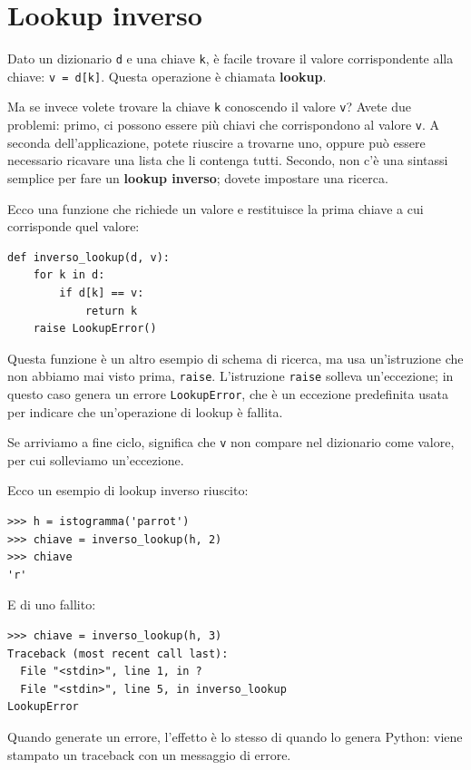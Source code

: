 \documentclass[10pt]{book}
\begin{document}
\section{Lookup inverso}
\label{raise}

Dato un dizionario {\tt d} e una chiave {\tt k}, è facile trovare il valore corrispondente alla chiave: {\tt v = d[k]}.  Questa operazione è chiamata {\bf lookup}.

Ma se invece volete trovare la chiave {\tt k} conoscendo il valore {\tt v}?
Avete due problemi: primo, ci possono essere più chiavi che corrispondono al valore {\tt v}.  A seconda dell'applicazione, potete riuscire a trovarne uno, oppure può essere necessario ricavare una lista che li contenga tutti. Secondo, non c'è una sintassi semplice per fare un {\bf lookup inverso}; dovete impostare una ricerca.

Ecco una funzione che richiede un valore e restituisce la prima chiave a cui corrisponde quel valore:

\begin{verbatim}
def inverso_lookup(d, v):
    for k in d:
        if d[k] == v:
            return k
    raise LookupError()
\end{verbatim}
%
Questa funzione è un altro esempio di schema di ricerca, ma usa un'istruzione che non abbiamo mai visto prima, {\tt raise}.  L'istruzione {\tt raise}
solleva un'eccezione; in questo caso genera un errore {\tt LookupError}, che è un eccezione predefinita usata per indicare che un'operazione di lookup è fallita.

Se arriviamo a fine ciclo, significa che {\tt v}
non compare nel dizionario come valore, per cui solleviamo un'eccezione.

Ecco un esempio di lookup inverso riuscito:

\begin{verbatim}
>>> h = istogramma('parrot')
>>> chiave = inverso_lookup(h, 2)
>>> chiave
'r'
\end{verbatim}
%
E di uno fallito:

\begin{verbatim}
>>> chiave = inverso_lookup(h, 3)
Traceback (most recent call last):
  File "<stdin>", line 1, in ?
  File "<stdin>", line 5, in inverso_lookup
LookupError
\end{verbatim}
%
Quando generate un errore, l'effetto è lo stesso di quando lo genera Python: viene stampato un traceback con un messaggio di errore.
\end{document}
